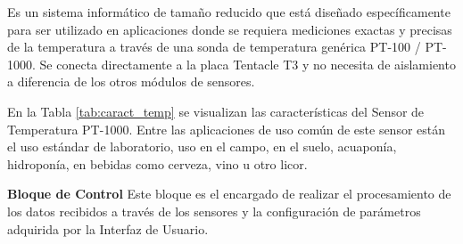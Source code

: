 Es un sistema informático de tamaño reducido que está diseñado específicamente para ser utilizado en aplicaciones donde se requiera mediciones exactas y precisas de la temperatura a través de una sonda de temperatura genérica PT-100 / PT-1000. Se conecta directamente a la placa Tentacle T3 y no necesita de aislamiento a diferencia de los otros módulos de sensores.

En la Tabla \ref{tab:caract_temp} se visualizan las características del Sensor de Temperatura PT-1000.
Entre las aplicaciones de uso común de este sensor están el uso estándar de laboratorio, uso en el campo, en el suelo, acuapon\'ia, hidroponía, en bebidas como cerveza, vino u otro licor.



\textbf{Bloque de Control}
Este bloque es el encargado de realizar el procesamiento de los datos recibidos a través de los sensores y la configuración de parámetros adquirida por la Interfaz de Usuario.

